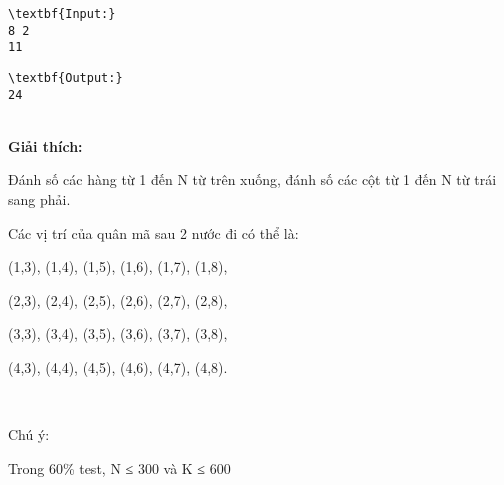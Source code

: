 \begin{verbatim}
\textbf{Input:}
8 2
11\end{verbatim}
\begin{verbatim}
\textbf{Output:}
24\end{verbatim}


\\\textbf{​Giải thích:}

Đánh số các hàng từ 1 đến N từ trên xuống, đánh số các cột từ 1 đến N từ trái sang phải.

Các vị trí của quân mã sau 2 nước đi có thể là:

(1,3), (1,4), (1,5), (1,6), (1,7), (1,8),

(2,3), (2,4), (2,5), (2,6), (2,7), (2,8),

(3,3), (3,4), (3,5), (3,6), (3,7), (3,8),

(4,3), (4,4), (4,5), (4,6), (4,7), (4,8).

 

Chú ý:

Trong 60\% test, N ≤ 300 và K ≤ 600